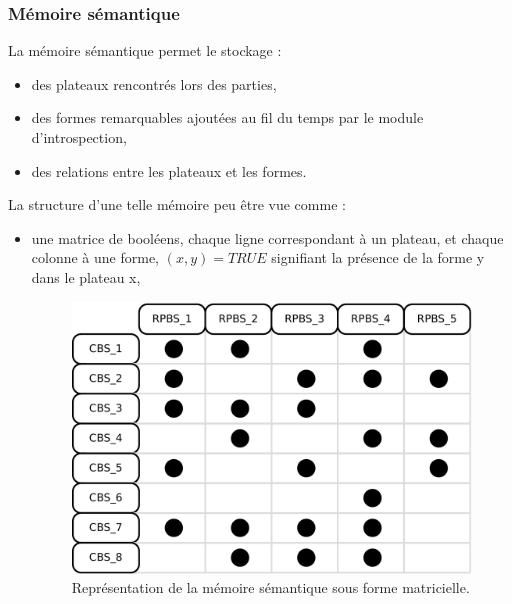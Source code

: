 \subsubsection{Mémoire sémantique}

La mémoire sémantique permet le stockage :
\begin{itemize}
\item des plateaux rencontrés lors des parties,
\item des formes remarquables ajoutées au fil du temps par le module  d'introspection,
\item des relations entre les plateaux et les formes.
\end{itemize}

La structure d'une telle mémoire peu être vue comme :
\begin{itemize}
\item une matrice de booléens, chaque ligne correspondant à un plateau, et chaque colonne à une forme, $(x,y)=TRUE$ signifiant la présence de la forme y dans le plateau x,
\begin{figure}[H]
\includegraphics[width=\textwidth]{files/memoire/context_matrix}
\caption{Représentation de la mémoire sémantique sous forme matricielle.}
\end{figure}



\end{itemize}
